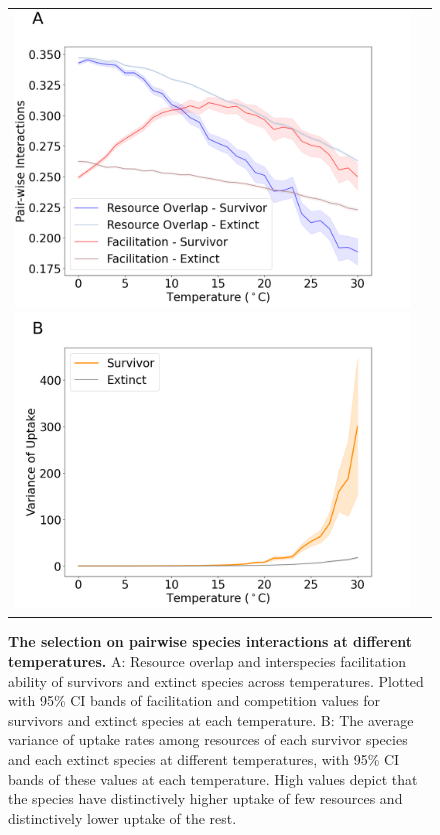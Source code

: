 \documentclass[11pt, a4paper]{article}
\begin{document}
\begin{spacing}{1.5}
\begin{figure}
    \centering
    \begin{tabular}{c@{}c@{}}
    \includegraphics[scale=0.27]{./Figures/Resource_overlap.png}
    \includegraphics[scale=0.27]{./Figures/VarU.png}
    \end{tabular}
    \caption{\textbf{The selection on pairwise species interactions at different temperatures.} A: Resource overlap and interspecies facilitation ability of survivors and extinct species across temperatures. Plotted with 95\% CI bands of facilitation and competition values for survivors and extinct species at each temperature. B: The average variance of uptake rates among resources of each survivor species and each extinct species at different temperatures, with 95\% CI bands of these values at each temperature. High values depict that the species have distinctively higher uptake of few resources and distinctively lower uptake of the rest.}
    \label{fig:cf}
\end{figure}


\end{spacing}
\end{document}
